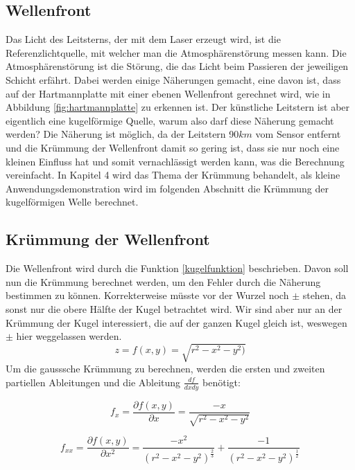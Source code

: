 \begin{refsection}
\section{Wellenfront}
Das Licht des Leitsterns, der mit dem Laser erzeugt wird, ist die Referenzlichtquelle, mit welcher man die Atmosphärenstörung messen kann. Die Atmosphärenstörung ist die Störung, die das Licht beim Passieren der jeweiligen Schicht erfährt. Dabei werden einige Näherungen gemacht, eine davon ist, dass auf der Hartmannplatte mit einer ebenen Wellenfront gerechnet wird, wie in Abbildung \ref{fig:hartmannplatte} zu erkennen ist. Der künstliche Leitstern ist aber eigentlich eine kugelförmige Quelle, warum also darf diese Näherung gemacht werden? Die Näherung ist möglich, da der Leitstern 90$km$ vom Sensor entfernt und die Krümmung der Wellenfront damit so gering ist, dass sie nur noch eine kleinen Einfluss hat und somit vernachlässigt werden kann, was die Berechnung vereinfacht. In Kapitel 4 wird das Thema der Krümmung behandelt, als kleine Anwendungsdemonstration wird im folgenden Abschnitt die Krümmung der kugelförmigen Welle berechnet.

\subsection{Krümmung der Wellenfront}
Die Wellenfront wird durch die Funktion \eqref{kugelfunktion} beschrieben. Davon soll nun die Krümmung berechnet werden, um den Fehler durch die Näherung bestimmen zu können. Korrekterweise müsste vor der Wurzel noch $\pm$ stehen, da sonst nur die obere Hälfte der Kugel betrachtet wird. Wir sind aber nur an der Krümmung der Kugel interessiert, die auf der ganzen Kugel gleich ist, weswegen  $\pm$ hier weggelassen werden.
\begin{equation}\label{kugelfunktion}
z=f(x,y)=\sqrt{r^{2}-x^{2}-y^{2})}
\end{equation}
Um die gausssche Krümmung zu berechnen, werden die ersten und zweiten partiellen Ableitungen und die Ableitung $ \frac{df}{dxdy}$ benötigt:

\begin{equation}\label{Ableitungen x}
f_{x}=\dfrac{\partial f(x,y)}{\partial x}= \dfrac{-x}{\sqrt{r^{2}-x^{2}-y^{2}}}
\end{equation}

\begin{equation}\label{Ableitungen xx}
f_{xx}=\dfrac{\partial f(x,y)}{\partial x^{2}}= \dfrac{- x^2}{(r^2 - x^2 - y^2)^{\frac{2}{3}}}+\dfrac{ - 1}{(r^2 - x^2 - y^2)^{\frac{1}{2}}}
\end{equation}


\end{refsection}
